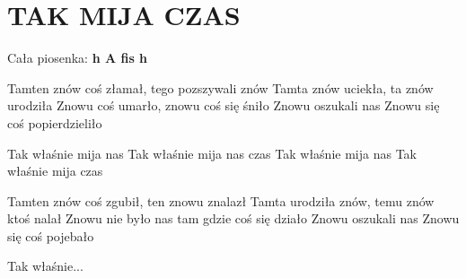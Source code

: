 \documentclass[../../../songbook.tex]{subfiles}
\begin{document}
\TabPositions{8cm} %
\section*{TAK MIJA CZAS}
{}
\vspace{0.5cm}
Cała piosenka: {\color{red}\textbf{h A fis h} } \newline

Tamten znów coś złamał, tego pozszywali znów \newline
Tamta znów uciekła, ta znów urodziła \newline
Znowu coś umarło, znowu coś się śniło \newline
Znowu oszukali nas \newline
Znowu się coś popierdzieliło \newline

\-\hspace{1cm} Tak właśnie mija nas \newline
\-\hspace{1cm} Tak właśnie mija nas czas \newline
\-\hspace{1cm} Tak właśnie mija nas \newline
\-\hspace{1cm} Tak właśnie mija czas \newline

Tamten znów coś zgubił, ten znowu znalazł \newline
Tamta urodziła znów, temu znów ktoś nalał \newline
Znowu nie było nas tam gdzie coś się działo \newline
Znowu oszukali nas \newline
Znowu się coś pojebało \newline

\-\hspace{1cm} Tak właśnie... \newline
\end{document}
